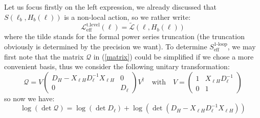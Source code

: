 \documentclass[11pt]{article}
\begin{document}
Let us focus firstly on the left expression, we already discussed that $S(\ell_b,H_b(\ell))$ is a non-local action, so we rather write:
\begin{equation}\label{matchingtreelevel}
    \mathcal{L}^{\text{t.level}}_{\text{eff}}(\ell)=\tilde{\mathcal{L}}(\ell,H_b(\ell))
\end{equation}
where the tilde stands for the formal power series truncation (the truncation obviously is determined by the precision we want). To determine $S^{\text{1-loop}}_{\text{eff}}$, we may first note that the matrix $\mathcal{Q}$ in (\ref{matrix}) could be simplified if we chose a more convenient basis, thus we consider the following unitary transformation:
\begin{equation}
    \mathcal{Q}= V\begin{pmatrix}
       D_H-X_{\ell H}D^{-1}_{\ell}X_{\ell H} & 0\\
        0 & D_\ell
    \end{pmatrix}V  ^\dagger\quad\text{with}\quad V=\begin{pmatrix}
        1 & X_{\ell H}D^{-1}_\ell\\
        0 & 1
    \end{pmatrix}
\end{equation}
so now we have:
\begin{equation}
    \log(\det \mathcal{Q})=\log(\det D_\ell)+\log(\det  (D_H-X_{\ell H}D^{-1}_\ell X_{\ell H}))
\end{equation}
\end{document}
